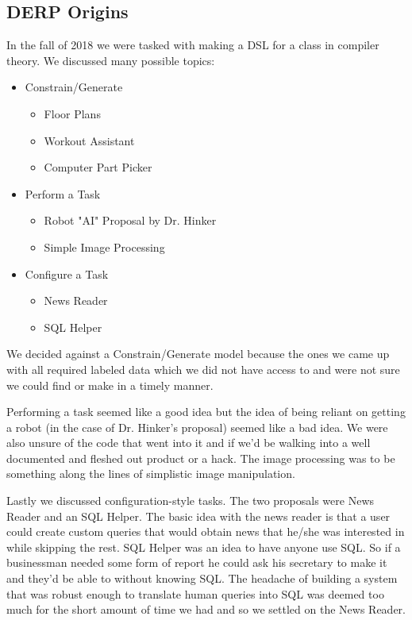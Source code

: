 \documentclass{article}
\begin{document}
\subsection{DERP Origins}
In the fall of 2018 we were tasked with making a DSL for a class in compiler theory. We discussed many possible topics:
\begin{itemize}
    \item{Constrain/Generate}
    \begin{itemize}
        \item{Floor Plans}
        \item{Workout Assistant}
        \item{Computer Part Picker}
    \end{itemize}
    \item{Perform a Task}
    \begin{itemize}
        \item{Robot "AI" Proposal by Dr. Hinker}
        \item{Simple Image Processing}
    \end{itemize}
    \item{Configure a Task}
    \begin{itemize}
        \item{News Reader}
        \item{SQL Helper}        
    \end{itemize}
\end{itemize}

We decided against a Constrain/Generate model because the ones we came up with all required labeled data which we did not have access to and were not sure we could find or make in a timely manner.

Performing a task seemed like a good idea but the idea of being reliant on getting a robot (in the case of Dr. Hinker's proposal) seemed like a bad idea. We were also unsure of the code that went into it and if we'd be walking into a well documented and fleshed out product or a hack. The image processing was to be something along the lines of simplistic image manipulation.

Lastly we discussed configuration-style tasks. The two proposals were News Reader and an SQL Helper. The basic idea with the news reader is that a user could create custom queries that would obtain news that he/she was interested in while skipping the rest. SQL Helper was an idea to have anyone use SQL. So if a businessman needed some form of report he could ask his secretary to make it and they'd be able to without knowing SQL. The headache of building a system that was robust enough to translate human queries into SQL was deemed too much for the short amount of time we had and so we settled on the News Reader.
\end{document}
